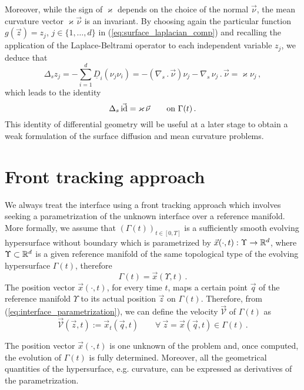 Moreover, while the sign of $\varkappa$ depends on the choice of the normal
$\vec\nu$, the mean curvature vector $\varkappa \vec\nu$ is an invariant. By
choosing again the particular function $g(\vec z) = z_j$, $j \in \{ 1,
\hdots, d \}$ in (\ref{eq:surface_laplacian_comp}) and recalling the application
of the Laplace-Beltrami operator to each independent variable $z_j$, we deduce
that
\begin{equation}
\Delta_s z_j = - \sum_{i = 1}^{d} \underline{D}_i (\nu_j \nu_i) =
- (\nabla_s \,.\, \vec\nu) \nu_j - \nabla_s \, \nu_j \,.\, \vec\nu = \varkappa
\nu_j\, ,
\end{equation}
which leads to the identity
\begin{equation} \label{eq:LBop}
\Delta_s\, \vec {\rm id} = \varkappa\, \vec\nu \qquad \mbox{on $\Gamma(t)$}\,.
\end{equation}
This identity of differential geometry will be useful at a later stage to
obtain a weak formulation of the surface diffusion and mean curvature problems.

\section[Front tracking approach]{Front tracking approach}
We always treat the interface using a front tracking approach which involves
seeking a parametrization of the unknown interface over a reference manifold.
More formally, we assume that $(\Gamma(t))_{t\in [0,T]}$ is a sufficiently
smooth evolving hypersurface without boundary which is parametrized by
$\vec x(\cdot,t):\Upsilon\to{\mathbb R}^d$, where $\Upsilon\subset {\mathbb R}^d$ is a given
reference manifold of the same topological type of the evolving hypersurface
$\Gamma(t)$, therefore
\begin{equation}\label{eq:interface_parametrization}
\Gamma(t) = \vec x(\Upsilon,t)\,.
\end{equation}
The position vector $\vec x(\cdot,t)$, for every time $t$, maps a certain point
$\vec{q}$ of the reference manifold $\Upsilon$ to its actual position
$\vec{z}$ on $\Gamma(t)$. Therefore, from (\ref{eq:interface_parametrization}),
we can define the velocity $\vec{\mathcal{V}}$ of $\Gamma(t)$ as
\begin{equation} \label{eq:V}
\vec{\mathcal{V}}(\vec z, t) := \vec x_t(\vec q, t) \qquad
\forall\ \vec z = \vec x(\vec q,t) \in \Gamma(t)\,.
\end{equation}

The position vector $\vec x(\cdot,t)$ is one unknown of the problem and, once
computed, the evolution of $\Gamma(t)$ is fully determined. Moreover, all the
geometrical quantities of the hypersurface, e.g. curvature, can be expressed as
derivatives of the parametrization.

